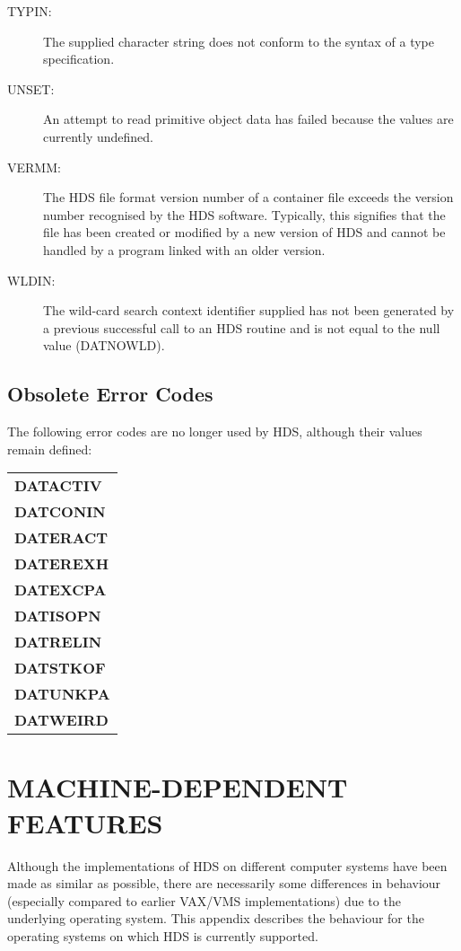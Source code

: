\documentclass[twoside,11pt]{article}
\newcommand{\htmlref}[2]{#1}
\newcommand{\xlabel}[1]{}
\renewcommand{\_}{\texttt{\symbol{95}}}
\begin{document}
\begin{description}
\item [TYPIN:]
The supplied character string does not conform to the syntax of a
\htmlref{type}{sect:type} specification.

\item [UNSET:]
An attempt to read primitive object data has failed because the values are
currently undefined.

\item [VERMM:]
The HDS file format version number of a container file exceeds the version
number recognised by the HDS software. Typically, this signifies that the file
has been created or modified by a new version of HDS and cannot be handled by a
program linked with an older version.

\item [WLDIN:]
The wild-card search context identifier supplied has not been generated by a
previous successful call to an HDS routine and is not equal to the null value
(DAT\_\_NOWLD).

\end{description}

\subsection{Obsolete Error Codes}
The following error codes are no longer used by HDS, although their values
remain defined:

\begin{center}
\begin{tabular}{l}
{\bf DAT\_\_ACTIV}\\
{\bf DAT\_\_CONIN}\\
{\bf DAT\_\_ERACT}\\
{\bf DAT\_\_EREXH}\\
{\bf DAT\_\_EXCPA}\\
{\bf DAT\_\_ISOPN}\\
{\bf DAT\_\_RELIN}\\
{\bf DAT\_\_STKOF}\\
{\bf DAT\_\_UNKPA}\\
{\bf DAT\_\_WEIRD}
\end{tabular}
\end{center}

\newpage
\section{\xlabel{machine_dependencies}MACHINE-DEPENDENT FEATURES}

Although the implementations of HDS on different computer systems have
been made as similar as possible, there are necessarily some
differences in behaviour (especially compared to earlier VAX/VMS
implementations) due to the underlying operating system. This appendix
describes the behaviour for the operating systems on which HDS is
currently supported.
\end{document}
